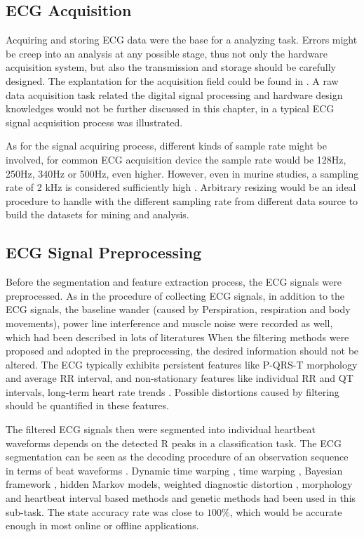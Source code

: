 \documentclass{bmcart}
\begin{document}
\subsection*{ECG Acquisition}
Acquiring and storing ECG data were the base for a analyzing task. Errors might be creep into an analysis at any possible stage, thus not only the hardware acquisition system, but also the transmission and storage should be carefully designed. The explantation for the acquisition field could be found in \cite{clifford2006web}. A raw data acquisition task related the digital signal processing and hardware design knowledges would not be further discussed in this chapter, in \cite{silva2011dsp} a typical ECG signal acquisition process was illustrated. 

As for the signal acquiring process, different kinds of sample rate might be involved, for common ECG acquisition device the sample rate would be 128Hz, 250Hz, 340Hz or 500Hz, even higher. However, even in murine studies, a sampling rate of 2 kHz is considered sufficiently high \cite{ai1996studies}. Arbitrary resizing would be an ideal procedure to handle with the different sampling rate from different data source to build the datasets for mining and analysis.

\subsection*{ECG Signal Preprocessing}
Before the segmentation and feature extraction process, the ECG signals were preprocessed. As in the procedure of collecting ECG signals,  in addition to the ECG signals, the baseline wander (caused by Perspiration, respiration and body movements), power line interference and muscle noise were recorded as well, which had been described in lots of literatures %
When the filtering methods were proposed and adopted in the preprocessing, the desired information should not be altered. The ECG typically exhibits persistent features like P-QRS-T morphology and average RR interval,  and non-stationary features like individual RR and QT intervals, long-term heart rate trends \cite{clifford2006advanced}. Possible distortions caused by filtering should be quantified in these features.

The filtered ECG signals then were segmented into individual heartbeat waveforms depends on the detected R peaks in a classification task.  The ECG segmentation can be seen as the decoding procedure of an observation sequence in terms of beat waveforms \cite{andreao2006ecg}. Dynamic time warping \cite{vullings1998automated}, time warping \cite{vullings1997ecg}, Bayesian framework \cite{sayadi2009model}, hidden Markov models\cite{andreao2006ecg}, weighted diagnostic distortion \cite{zigel2000weighted}, morphology and heartbeat interval based methods \cite{de2004automatic} and genetic methods \cite{gacek2003genetic} had been used in this sub-task. The state accuracy rate was close to $100\%$, which would be accurate enough in most online or offline applications. 
\end{document}
